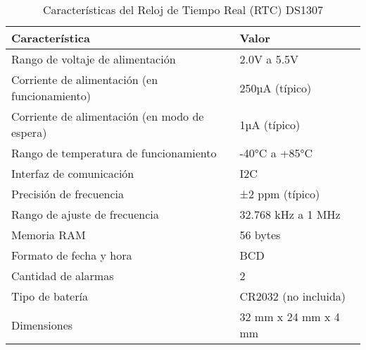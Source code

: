 \begin{table}[H]
\centering
\caption{Características del Reloj de Tiempo Real (RTC) DS1307}
\label{tab:rtc_ds1307_caracteristicas}
\begin{tabular}{|l|l|}
\hline
\textbf{Característica}                              & \textbf{Valor}                       \\ \hline
Rango de voltaje de alimentación                     & 2.0V a 5.5V                          \\ \hline
Corriente de alimentación (en funcionamiento)        & 250µA (típico)                       \\ \hline
Corriente de alimentación (en modo de espera)        & 1µA (típico)                         \\ \hline
Rango de temperatura de funcionamiento               & -40°C a +85°C                        \\ \hline
Interfaz de comunicación                             & I2C                                  \\ \hline
Precisión de frecuencia                              & ±2 ppm (típico)                      \\ \hline
Rango de ajuste de frecuencia                        & 32.768 kHz a 1 MHz                   \\ \hline
Memoria RAM                                          & 56 bytes                             \\ \hline
Formato de fecha y hora                              & BCD                                  \\ \hline
Cantidad de alarmas                                  & 2                                    \\ \hline
Tipo de batería                                      & CR2032 (no incluida)                 \\ \hline
Dimensiones                                          & 32 mm x 24 mm x 4 mm                 \\ \hline
\end{tabular}
\end{table}
